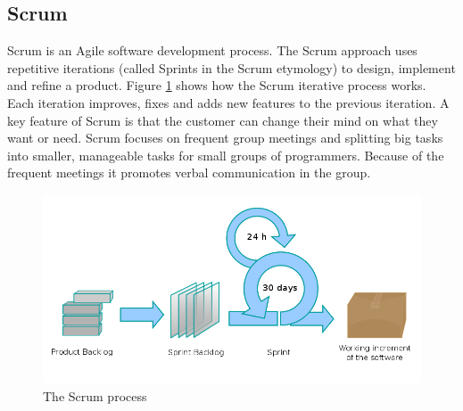 \subsection{Scrum} 
\label{section:scrum}
Scrum is an Agile software development process. The Scrum approach uses repetitive iterations (called
Sprints in the Scrum etymology) to design, implement and refine a product. Figure \ref{fig:designmodel-scrum} shows
how the Scrum iterative process works. Each iteration improves, fixes and adds new features to the previous iteration.
A key feature of Scrum is that the customer can change their mind on what they want or need. Scrum focuses on frequent 
group meetings and splitting big tasks into smaller, manageable tasks for small groups of programmers. Because of the
frequent meetings it promotes verbal communication in the group.
\begin{figure}[h!]
\centering \includegraphics[scale=0.4]{img/designmodel-scrum}
\caption{The Scrum process~\cite{link:wiki-scrum}}
\label{fig:designmodel-scrum}
\end{figure}

